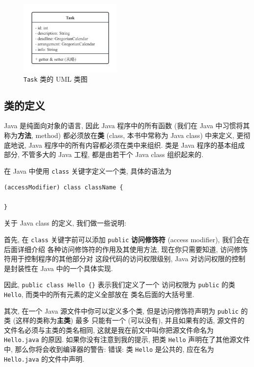 \documentclass[10pt,UTF8]{book} %
\begin{document}
\begin{figure}[H]
    \centering
    \includegraphics*[width=0.45\textwidth]{pic/UML/Task.png}
    \caption{\lstinline|Task| 类的 UML 类图}
    \label{uml:class TaskManagement.Task}
\end{figure}

\subsection{类的定义}

Java 是纯面向对象的语言, 因此 Java 程序中的所有函数 
(我们在 Java 中习惯将其称为\textbf{方法}, method) 都必须放在\textbf{类} (class,
本书中常称为 Java class) 中来定义,
更彻底地说, Java 程序中的所有内容都必须在类中来组织.
类是 Java 程序的基本组成部分, 不管多大的 Java 工程, 都是由若干个 Java class 组织起来的.

在 Java 中使用 \lstinline|class|
关键字定义一个类, 具体的语法为
\begin{lstlisting}
(accessModifier) class className {

}
\end{lstlisting}
关于 Java class 的定义, 我们做一些说明:

首先, 在 \lstinline|class| 关键字前可以添加 
\lstinline|public| \textbf{访问修饰符} (access modifier), 我们会在后面详细介绍
各种访问修饰符的作用及其使用方法, 现在你只需要知道, 访问修饰符用于控制程序的其他部分对
这段代码的访问权限级别, Java 对访问权限的控制是封装性在 Java 中的一个具体实现.

因此, \lstinline|public class Hello {}| 表示我们定义了一个
访问权限为 \lstinline|public| 的类 \lstinline|Hello|, 而类中的所有元素的定义全部放在
类名后面的大括号里.

其次, 在一个 Java 源文件中你可以定义多个类, 
但是访问修饰符声明为 \lstinline|public| 的类 (这样的类称为\textbf{主类}) 最多
只能有一个 (可以没有), 并且如果有的话, 源文件的文件名必须与主类的类名相同, 
这就是我在前文中叫你把源文件命名为 \lstinline|Hello.java| 的原因.
如果你没有注意到我的提示,
把类 \lstinline|Hello| 声明在了其他源文件中, 那么你将会收到编译器的警告:
\kaishu 错误: 类 \lstinline|Hello| 是公共的,
应在名为 \lstinline|Hello.java| 的文件中声明. \songti
\end{document}
